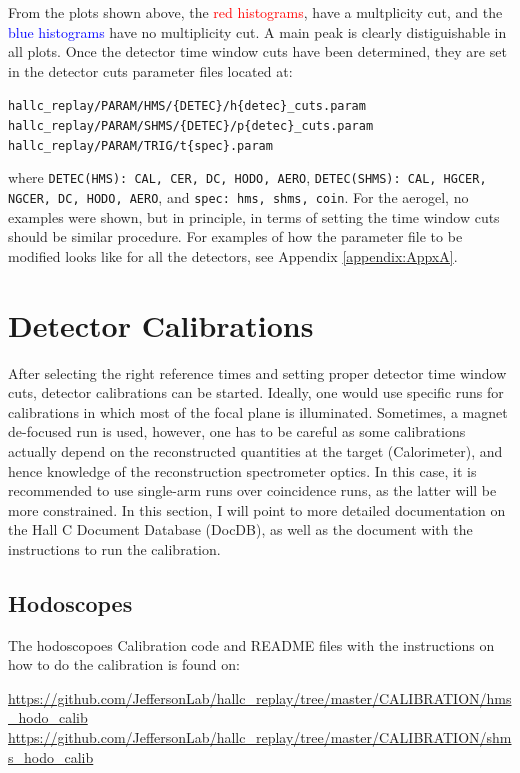 \documentclass[14pt]{article}
\begin{document}
\noindent From the plots shown above, the \textcolor{red}{red histograms}, have a multplicity cut, and the \textcolor{blue}{blue histograms} have no multiplicity cut. A main
peak is clearly distiguishable in all plots. 
Once the detector time window cuts have been determined, they are set in the detector cuts parameter files located at:
\begin{flushleft}
  \texttt{hallc\_replay/PARAM/HMS/\{DETEC\}/h\{detec\}\_cuts.param} \\
  \texttt{hallc\_replay/PARAM/SHMS/\{DETEC\}/p\{detec\}\_cuts.param} \\
  \texttt{hallc\_replay/PARAM/TRIG/t\{spec\}.param} 
\end{flushleft}
where \texttt{DETEC(HMS): CAL, CER, DC, HODO, AERO}, \texttt{DETEC(SHMS): CAL, HGCER, NGCER, DC, HODO, AERO}, and
\texttt{spec: hms, shms, coin}.
For the aerogel, no examples were shown, but in principle, in terms of setting the time window cuts should be similar procedure.
For examples of how the parameter file to be modified looks like for all the detectors, see Appendix \ref{appendix:AppxA}.
\section{Detector Calibrations}
After selecting the right reference times and setting proper detector time window cuts, detector calibrations can be started. Ideally, one would
use specific runs for calibrations in which most of the focal plane is illuminated. Sometimes, a magnet de-focused run is used, however, one has to be
careful as some calibrations actually depend on the reconstructed quantities at the target (Calorimeter), and hence knowledge of the reconstruction
spectrometer optics. In this case, it is recommended to use single-arm runs over coincidence runs, as the latter will be more constrained. In this section,
I will point to more detailed documentation on the Hall C Document Database (DocDB), as well as the document with the instructions to run the calibration.

\subsection{Hodoscopes}
The hodoscopoes Calibration code and README files with the instructions on how to do the calibration is found on:
\begin{center}
  \url{https://github.com/JeffersonLab/hallc_replay/tree/master/CALIBRATION/hms_hodo_calib} \\
   \url{ https://github.com/JeffersonLab/hallc_replay/tree/master/CALIBRATION/shms_hodo_calib}
\end{center}
\end{document}
